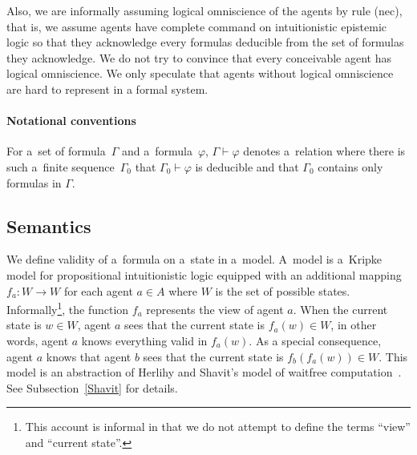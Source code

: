 \documentclass[doctor]{iscs-thesis}
\begin{document}
Also, 
we are informally
assuming logical omniscience of the agents by rule (nec),
 that is, we assume agents have complete
command on intuitionistic epistemic logic so that they acknowledge every formulas
deducible from the set of formulas they acknowledge.
We do not try to convince that every conceivable agent has logical omniscience.
We only speculate that agents without logical omniscience are hard to represent in a
formal system.

\paragraph{Notational conventions}
For a~set of formula~$\Gamma$ and a~formula~$\varphi$, $\Gamma\vdash
\varphi$ denotes a~relation where
there is such a~finite sequence~$\Gamma_0$ that 
$\Gamma_0\vdash
\varphi$ is deducible and that $\Gamma_0$ contains only formulas in $\Gamma$.

\subsection{Semantics}
We define validity of a~formula on a~state in a~model.
A~model is a~Kripke model for propositional intuitionistic logic
equipped with an additional
mapping $f_a: W\rightarrow W$ for each agent $a\in A$ where $W$ is the
set of possible states.
Informally\footnote{This account is informal in that we do not attempt to
define the terms ``view'' and ``current state''.},
 the function $f_a$ represents the view of agent
$a$.
When the current state is $w\in W$\kern -2pt, agent $a$ sees that the current state is
$f_a(w)\in W$, in other words, agent $a$ knows everything valid in $f_a(w)$.
As a special consequence, agent $a$ knows that agent $b$ sees that the current state
is
$f_b(f_a(w))\in W$\kern -2pt.
This model is an abstraction of Herlihy and Shavit's model of waitfree
computation~\cite{herlihy1999topological}.
See Subsection~\ref{Shavit} for details.
\end{document}
